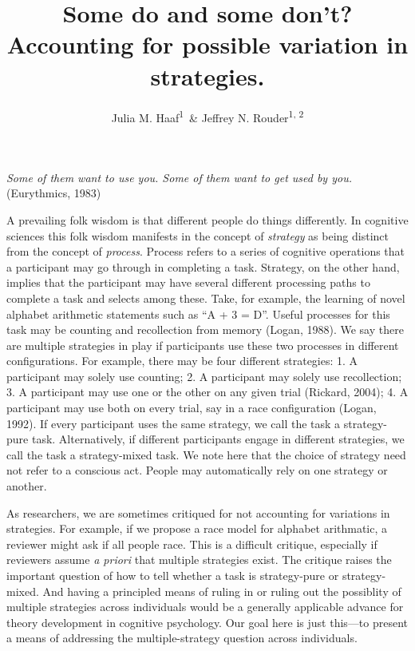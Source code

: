 \documentclass[english,man]{apa6}
\title{Some do and some don't? Accounting for possible variation in strategies.}
\author{Julia M. Haaf\textsuperscript{1}~\& Jeffrey N. Rouder\textsuperscript{1, 2}}
\affiliation{
    \vspace{0.5cm}
          \textsuperscript{1} University of Missouri\\
          \textsuperscript{2} University of California, Irvine  }
\theoremstyle{definition}
\theoremstyle{definition}
\theoremstyle{remark}
\begin{document}
\maketitle

\setcounter{secnumdepth}{0}



\emph{Some of them want to use you. Some of them want to get used by
you.} (Eurythmics, 1983)

A prevailing folk wisdom is that different people do things differently.
In cognitive sciences this folk wisdom manifests in the concept of
\emph{strategy} as being distinct from the concept of \emph{process}.
Process refers to a series of cognitive operations that a participant
may go through in completing a task. Strategy, on the other hand,
implies that the participant may have several different processing paths
to complete a task and selects among these. Take, for example, the
learning of novel alphabet arithmetic statements such as \enquote{A + 3
= D}. Useful processes for this task may be counting and recollection
from memory (Logan, 1988). We say there are multiple strategies in play
if participants use these two processes in different configurations. For
example, there may be four different strategies: 1. A participant may
solely use counting; 2. A participant may solely use recollection; 3. A
participant may use one or the other on any given trial (Rickard, 2004);
4. A participant may use both on every trial, say in a race
configuration (Logan, 1992). If every participant uses the same
strategy, we call the task a strategy-pure task. Alternatively, if
different participants engage in different strategies, we call the task
a strategy-mixed task. We note here that the choice of strategy need not
refer to a conscious act. People may automatically rely on one strategy
or another.

As researchers, we are sometimes critiqued for not accounting for
variations in strategies. For example, if we propose a race model for
alphabet arithmatic, a reviewer might ask if all people race. This is a
difficult critique, especially if reviewers assume \emph{a priori} that
multiple strategies exist. The critique raises the important question of
how to tell whether a task is strategy-pure or strategy-mixed. And
having a principled means of ruling in or ruling out the possiblity of
multiple strategies across individuals would be a generally applicable
advance for theory development in cognitive psychology. Our goal here is
just this---to present a means of addressing the multiple-strategy
question across individuals.
\end{document}
